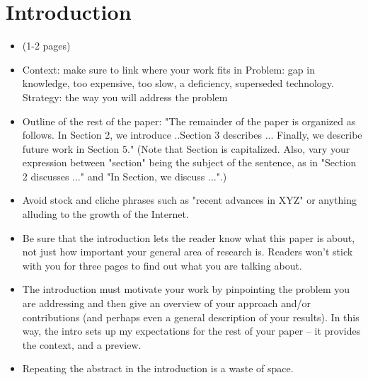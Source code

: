 \chapter{Introduction}\label{chapter:introduction}

\begin{itemize}
\color{red} 
    \item (1-2 pages)
    \item Context: make sure to link where your work fits in Problem: gap in knowledge, too expensive, too slow, a deficiency, superseded technology. Strategy: the way you will address the problem
    \item Outline of the rest of the paper: "The remainder of the paper is organized as follows. In Section 2, we introduce ..Section 3 describes ... Finally, we describe future work in Section 5." (Note that Section is capitalized. Also, vary your expression between "section" being the subject of the sentence, as in "Section 2 discusses ..." and "In Section, we discuss ...".)
    \item Avoid stock and cliche phrases such as "recent advances in XYZ" or anything alluding to the growth of the Internet. 
    \item Be sure that the introduction lets the reader know what this paper is about, not just how important your general area of research is. Readers won't stick with you for three pages to find out what you are talking about.
    \item The introduction must motivate your work by pinpointing the problem you are addressing and then give an overview of your approach and/or contributions (and perhaps even a general description of your results). In this way, the intro sets up my expectations for the rest of your paper -- it provides the context, and a preview.
    \item Repeating the abstract in the introduction is a waste of space.
\end{itemize}

